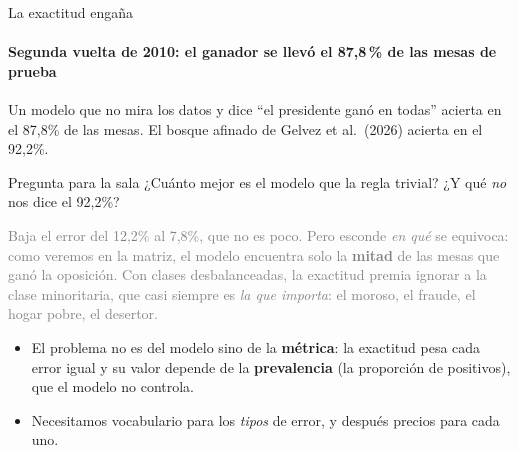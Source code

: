 \documentclass{beamer}
\newcommand{\1}{\mathbb{I}}
\begin{document}
\begin{frame}{La exactitud engaña}
\framesubtitle{Segunda vuelta de 2010: el ganador se llevó el 87,8\,\% de las mesas de prueba}
\small
Un modelo que no mira los datos y dice ``el presidente ganó en todas'' acierta en el 87,8\% de las mesas. El bosque afinado de Gelvez et al.\ (2026) acierta en el 92,2\%.
\pause
\vspace{0.15cm}
\begin{block}{Pregunta para la sala}
¿Cuánto mejor es el modelo que la regla trivial? ¿Y qué \emph{no} nos dice el 92,2\%?
\end{block}
\pause
\textcolor{gray}{Baja el error del 12,2\% al 7,8\%, que no es poco. Pero esconde \emph{en qué} se equivoca: como veremos en la matriz, el modelo encuentra solo la \textbf{mitad} de las mesas que ganó la oposición. Con clases desbalanceadas, la exactitud premia ignorar a la clase minoritaria, que casi siempre es \emph{la que importa}: el moroso, el fraude, el hogar pobre, el desertor.}
\pause
\vspace{0.15cm}
\begin{itemize}\itemsep4pt
  \item El problema no es del modelo sino de la \textbf{métrica}: la exactitud pesa cada error igual y su valor depende de la \textbf{prevalencia} (la proporción de positivos), que el modelo no controla.
  \item Necesitamos vocabulario para los \emph{tipos} de error, y después precios para cada uno.
\end{itemize}
\end{frame}
\end{document}
